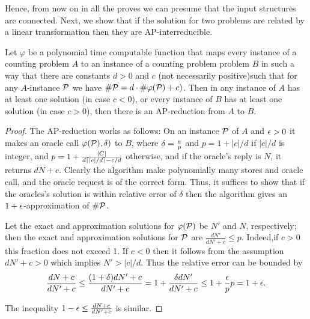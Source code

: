 Hence, from now on in all the proves we can presume that the input structures are connected.
Next, we show that if the solution for two problems are related by a linear transformation then they
are AP-interreducible. 

\begin{lemma}\label{lemma:linear}
Let \(\varphi\) be a polynomial time computable function that maps every instance of a
counting problem \(A\) to an instance of a counting problem problem \(B\) in such a way that
there are constants \(d > 0\) and \(c\) (not necessarily positive)such that
for any \(A\)-instance \(\mathcal{P}\) we have
\(\#\mathcal{P} = d\cdot \#\varphi(\mathcal{P}) + c)\)\@. Then in any instance of \(A\)
has at least one solution 
(in case \(c < 0\)), or every instance of \(B\) has at least one solution (in case \(c>0\)), then
there is an AP-reduction from \(A\) to \(B\)\@.
\end{lemma}
\begin{proof}
The AP-reduction works as follows: On an instance \(\mathcal{P}\) of \(A\) and \(\epsilon > 0\) it makes 
an oracle call \(\varphi(\mathcal{P}),\delta)\) to \(B\), where \(\delta = \frac{\epsilon}{p}\) and 
\(p = 1 + |c|/d\) if \(|c|/d\) is integer, and \(p = 1 + \frac{|C|}{d\lceil|c|/d\rceil-c/d}\) otherwise,
and if the oracle's reply is \(N\), it returns \(dN + c\)\@. Clearly the algorithm make polynomially 
many stores and oracle call, and the oracle request is of the correct form.
Thus, it suffices to show that if the oracles's solution is within relative error of \(\delta\) then
the algorithm gives an \(1+\epsilon\)-approximation of \(\#\mathcal{P}\)\@.

Let the exact and approximation solutions for \(\varphi(\mathcal{P})\) be \(N'\) and \(N\), respectively;
then the exact and approximation solutions for \(\mathcal{P}\) are \(\frac{dN'}{dN'+c} \le p\)\@.
Indeed,if \(c > 0\) this fraction does not exceed 1\@. If \(c < 0\) then 
it follows from the assumption \(dN' + c > 0\) which implies \(N' > |c|/d\)\@.
Thus the relative error can be bounded by 
\[\frac{dN + c}{dN' + c} \le \frac{(1+\delta)dN' + c}{dN'+c} = 1 + \frac{\delta d N'}{d N' + c} \le 1 + \frac{\epsilon}{p}p = 1 + \epsilon.\]

The inequality \(1-\epsilon \le \frac{dN + c}{dN' + c}\) is similar.
\end{proof}

